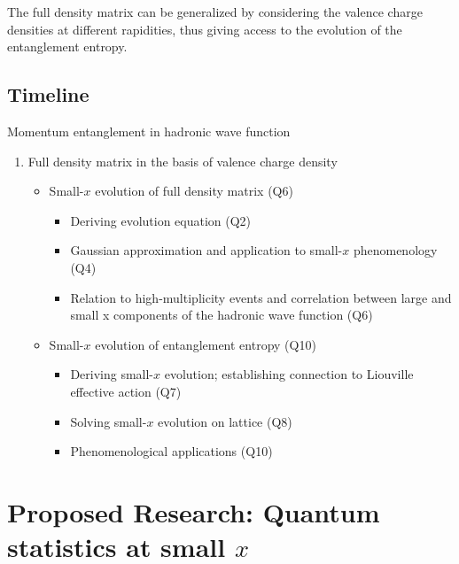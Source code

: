 	The full density matrix can be generalized by considering the 
	valence charge densities at different rapidities, 
	thus giving access to the evolution of the entanglement entropy.   


    \vspace{0.5em}
    \subsection{Timeline}
        \label{sec:p22}
Momentum entanglement in hadronic wave function
        \begin{enumerate}
            \item Full density matrix  in the basis 
				of valence charge density
                \begin{itemize}
                    \item Small-$x$ evolution of full density matrix (Q6)
                        \begin{itemize}
                            \item Deriving evolution equation (Q2)
                            \item Gaussian approximation and application to small-$x$ 
								phenomenology (Q4)
                            \item Relation to high-multiplicity events and correlation between large and small x components of the hadronic  wave function (Q6)
                        \end{itemize}
                    \item  Small-$x$ evolution of entanglement entropy (Q10)
                        \begin{itemize}
                            \item Deriving small-$x$ evolution; establishing connection to Liouville effective action   (Q7)
                            \item Solving small-$x$ evolution on lattice (Q8)
                            \item Phenomenological applications  (Q10)
                        \end{itemize}
                \end{itemize}
        \end{enumerate}

\section{Proposed Research: Quantum statistics at small $x$}
    \label{sec:p3}

